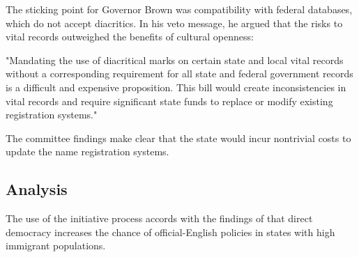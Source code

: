 The sticking point for Governor Brown was compatibility with federal databases,
which do not accept diacritics. In his veto message, he argued that the risks
to vital records outweighed the benefits of cultural openness:

"Mandating the use of diacritical marks on certain state and local vital records
without a corresponding requirement for all state and federal government records
is a difficult and expensive proposition. This bill would create inconsistencies
in vital records and require significant state funds to replace or modify
existing registration systems."

The committee findings make clear that the state would incur nontrivial costs to
update the name registration systems.

\subsection{Analysis}

The use of the initiative process accords with the findings of \textcite{liu14}
that direct democracy increases the chance of official-English policies in
states with high immigrant populations.
